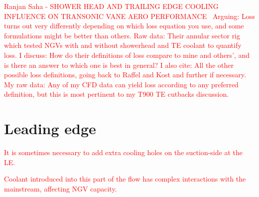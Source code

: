 \documentclass[a4paper, 11pt, oneside]{report}
\begin{document}
\textcolor{red}{Ranjan Saha - SHOWER HEAD AND TRAILING EDGE COOLING INFLUENCE ON TRANSONIC VANE AERO PERFORMANCE~\cite{saha_loss}}
	\textcolor{red}{Arguing: Loss turns out very differently depending on which loss equation you use, and some formulations might be better than others.}
	\textcolor{red}{Raw data: Their annular sector rig which tested NGVs with and without showerhead and TE coolant to quantify loss.}
	\textcolor{red}{I discuss: How do their definitions of loss compare to mine and others', and is there an answer to which one is best in general?}
	\textcolor{red}{I also cite: All the other possible loss definitions, going back to Raffel and Kost and further if necessary.}
	\textcolor{red}{My raw data: Any of my CFD data can yield loss according to any preferred definition, but this is most pertinent to my T900 TE cutbacks discussion.}



\chapter{Leading edge}
\label{chapter_leading_edge}



\textcolor{red}{It is sometimes necessary to add extra cooling holes on the suction-side at the LE.}

\textcolor{red}{Coolant introduced into this part of the flow has complex interactions with the mainstream, affecting NGV capacity.}
 
\end{document}
